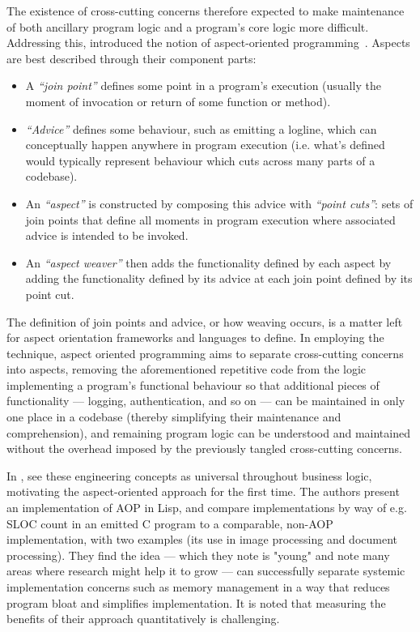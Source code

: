 The existence of cross-cutting concerns therefore expected to make maintenance
of both ancillary program logic and a program's core logic more difficult.
Addressing this, \citeauthor{kiczales1997aspect} introduced the notion of
aspect-oriented programming~\cite{kiczales1997aspect}. Aspects are best
described through their component parts:

\begin{itemize}
    \item A \emph{``join point''} defines some point in a program's execution
(usually the moment of invocation or return of some function or method).
    \item \emph{``Advice''} defines some behaviour, such as emitting a logline, which
    can conceptually happen anywhere in program execution (i.e. what's defined
    would typically represent behaviour which cuts across many parts of a
    codebase).
    \item An \emph{``aspect''} is constructed by composing this advice with
    \emph{``point cuts''}: sets of join points that define all moments in
    program execution where associated advice is intended to be invoked.
    \item An \emph{``aspect weaver''} then adds the functionality defined by
    each aspect by adding the functionality defined by its advice at each join
    point defined by its point cut.
\end{itemize}

The definition of join points and advice, or how weaving occurs, is a matter
left for aspect orientation frameworks and languages to define. In employing the
technique, aspect oriented programming aims to separate cross-cutting concerns
into aspects, removing the aforementioned repetitive code from the logic
implementing a program's functional behaviour so that additional pieces of
functionality --- logging, authentication, and so on --- can be maintained in
only one place in a codebase (thereby simplifying their maintenance and
comprehension), and remaining program logic can be understood and maintained
without the overhead imposed by the previously tangled cross-cutting concerns.

In \cite{kiczales1997aspect}, \citeauthor{kiczales1997aspect} see these
engineering concepts as universal throughout business logic, motivating the
aspect-oriented approach for the first time. The authors present an
implementation of AOP in Lisp, and compare implementations by way of e.g. SLOC
count in an emitted C program to a comparable, non-AOP implementation, with two
examples (its use in image processing and document processing). They find the
idea --- which they note is "young" and note many areas where research might
help it to grow --- can successfully separate systemic implementation concerns
such as memory management in a way that reduces program bloat and simplifies
implementation. It is noted that measuring the benefits of their approach
quantitatively is challenging.

